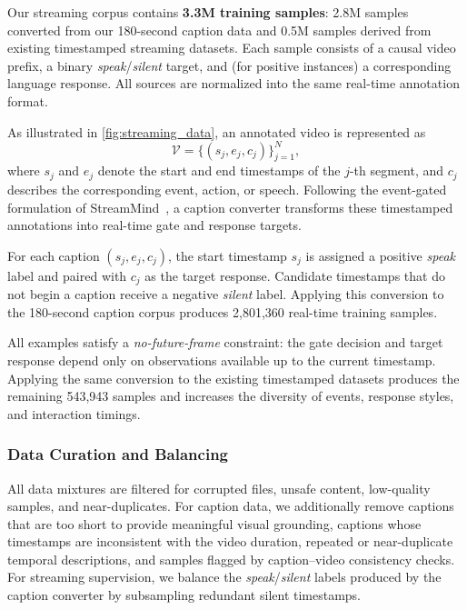 

Our streaming corpus contains \textbf{3.3M training samples}: 2.8M samples converted from our 180-second caption data and 0.5M samples derived from existing timestamped streaming datasets. Each sample consists of a causal video prefix, a binary \emph{speak}/\emph{silent} target, and (for positive instances) a corresponding language response. All sources are normalized into the same real-time annotation format.



As illustrated in \cref{fig:streaming_data}, an annotated video is represented as
\[
\mathcal{V}=\{(s_j,e_j,c_j)\}_{j=1}^{N},
\]
where $s_j$ and $e_j$ denote the start and end timestamps of the $j$-th segment, and $c_j$ describes the corresponding event, action, or speech. Following the event-gated formulation of StreamMind~\citep{ding2025streammindunlockingframerate}, a caption converter transforms these timestamped annotations into real-time gate and response targets.

For each caption $(s_j,e_j,c_j)$, the start timestamp $s_j$ is assigned a positive \emph{speak} label and paired with $c_j$ as the target response. Candidate timestamps that do not begin a caption receive a negative \emph{silent} label. Applying this conversion to the 180-second caption corpus produces 2,801,360 real-time training samples.

All examples satisfy a \emph{no-future-frame} constraint: the gate decision and target response depend only on observations available up to the current timestamp. Applying the same conversion to the existing timestamped datasets produces the remaining 543,943 samples and increases the diversity of events, response styles, and interaction timings.

\subsubsection{Data Curation and Balancing}
\label{sec:data_curation}
All data mixtures are filtered for corrupted files, unsafe content, low-quality samples, and near-duplicates. For caption data, we additionally remove captions that are too short to provide meaningful visual grounding, captions whose timestamps are inconsistent with the video duration, repeated or near-duplicate temporal descriptions, and samples flagged by caption--video consistency checks. For streaming supervision, we balance the \emph{speak}/\emph{silent} labels produced by the caption converter by subsampling redundant silent timestamps.

